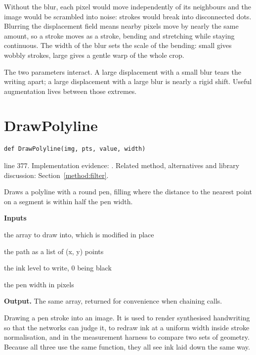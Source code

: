 Without the blur, each pixel would move independently of its neighbours and the image would be scrambled into noise: strokes would break into disconnected dots. Blurring the displacement field means nearby pixels move by nearly the same amount, so a stroke moves as a stroke, bending and stretching while staying continuous. The width of the blur sets the scale of the bending: small gives wobbly strokes, large gives a gentle warp of the whole crop.

The two parameters interact. A large displacement with a small blur tears the writing apart; a large displacement with a large blur is nearly a rigid shift. Useful augmentation lives between those extremes.



\section{DrawPolyline}\label{fn:segment:DrawPolyline}
\begin{lstlisting}[style=sig]
def DrawPolyline(img, pts, value, width)
\end{lstlisting}
 line 377. Implementation evidence: \cite{code2026}. Related method, alternatives and library discussion: Section~\ref{method:filter}.


Draws a polyline with a round pen, filling where the distance to the nearest point on a segment is within half the pen width.




\noindent\textbf{Inputs}
\begin{description}[leftmargin=2.2em,style=nextline,font=\normalfont\ttfamily]\setlength\itemsep{1pt}
  \item[{img}] \normalfont the array to draw into, which is modified in place
  \item[{pts}] \normalfont the path as a list of (x, y) points
  \item[{value}] \normalfont the ink level to write, 0 being black
  \item[{width}] \normalfont the pen width in pixels
\end{description}

\noindent\textbf{Output.} The same array, returned for convenience when chaining calls.


Drawing a pen stroke into an image. It is used to render synthesised handwriting so that the networks can judge it, to redraw ink at a uniform width inside stroke normalisation, and in the measurement harness to compare two sets of geometry. Because all three use the same function, they all see ink laid down the same way.


